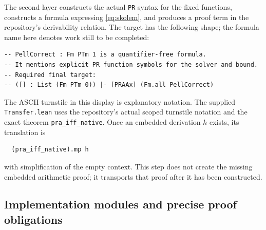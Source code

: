 \documentclass[11pt,letterpaper]{article}
\theoremstyle{definition}
\newcommand{\code}[1]{\texttt{#1}}
\begin{document}
The second layer constructs the actual \code{PR} syntax for the fixed
functions, constructs a formula expressing \eqref{eq:skolem}, and produces
a proof term in the repository's derivability relation. The target has the
following shape; the formula name here denotes work still to be completed:
\begin{lstlisting}
-- PellCorrect : Fm PTm 1 is a quantifier-free formula.
-- It mentions explicit PR function symbols for the solver and bound.
-- Required final target:
-- ([] : List (Fm PTm 0)) |- [PRAAx] (Fm.all PellCorrect)
\end{lstlisting}
The ASCII turnstile in this display is explanatory notation. The supplied
\code{Transfer.lean} uses the repository's actual scoped turnstile notation
and the exact theorem \code{pra\_iff\_native}. Once an embedded derivation
$h$ exists, its translation is
\begin{lstlisting}
  (pra_iff_native).mp h
\end{lstlisting}
with simplification of the empty context. This step does not create the
missing embedded arithmetic proof; it transports that proof after it has
been constructed.

\subsection{Implementation modules and precise proof obligations}
\end{document}
